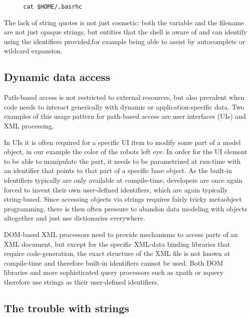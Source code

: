 \documentclass[preprint,authoryear]{acm_proc_article-sp}
\begin{document}
\begin{figure}[htbp]
\begin{lstlisting}[style=L,label=sh-file-contents,caption=File contents in a shell.]
  cat $HOME/.basrhc
\end{lstlisting}
\end{figure}

The lack of string quotes is not just cosmetic: both the variable and the filename
are not just opaque strings, but entities that the shell is aware of and can identify
using the identifiers provided,for example being able to assist by autocomplete 
or wildcard expansion.


\subsection{Dynamic data access}

Path-based access is not restricted to external resources, but also
prevalent when code needs to interact generically with dynamic
or application-specific data.   Two examples of this usage pattern
 for path-based access are user interfaces (UIs) and XML processing.

In UIs it is often required for
a specific UI item to modify some part of a model object, in our
example the color of the robots left eye.  In order for the UI element to be
able to manipulate the part, it needs to be parametrized at run-time with
an identifier that points to that part of a specific base object.   As the built-in
 identifiers typically are only available at compile-time, developers are
 once again forced to invent their own user-defined identifiers, which are again 
 typically string-based.  Since accessing objects via strings requires fairly tricky
 metaobject programming, there is then often pressure to abandon data
 modeling with objects altogether and just use dictionaries everywhere.

DOM-based XML processors need to provide mechanisms to access parts of
an XML document, but except for the specific XML-data binding libraries that
require code-generation, the exact structure of the XML file is not known at 
compile-time and therefore built-in identifiers cannot be used.  Both DOM libraries
and more sophisticated query processors such as xpath or xquery therefore use
strings as their user-defined identifiers.


\subsection{The trouble with strings}
\label{stringtrouble}
\end{document}
